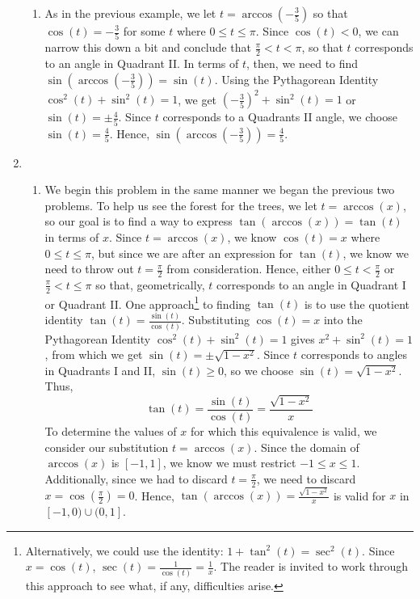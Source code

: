 \begin{ex}
\begin{enumerate}
\begin{enumerate}
\item  As in the previous example, we let $t = \arccos\left(-\frac{3}{5}\right)$ so that  $\cos(t) = -\frac{3}{5}$ for some $t$ where  $0 \leq t \leq \pi$.  Since $\cos(t) < 0$, we can narrow this down a bit and conclude that $\frac{\pi}{2} < t < \pi$, so that $t$ corresponds to an angle in Quadrant II. In terms of $t$, then, we need to find $\sin\left(\arccos\left(-\frac{3}{5}\right)\right) = \sin(t)$.  Using the Pythagorean Identity $\cos^{2}(t) + \sin^{2}(t) = 1$, we get $\left(-\frac{3}{5}\right)^2 + \sin^{2}(t) = 1$ or $\sin(t) = \pm \frac{4}{5}$.  Since $t$ corresponds to a Quadrants II angle, we choose  $\sin(t) = \frac{4}{5}$.  Hence,  $\sin\left(\arccos\left(-\frac{3}{5}\right)\right) = \frac{4}{5}$.

\end{enumerate}

\item

\begin{enumerate}

\item We begin this problem in the same manner we began the previous two problems.  To help us see the forest for the trees, we let  $t = \arccos(x)$, so our goal is to find a way to express $\tan\left(\arccos\left(x \right)\right) = \tan(t)$ in terms of $x$.  Since $t = \arccos(x)$, we know $\cos(t) = x$ where $0 \leq t \leq \pi$, but since we are after an expression for $\tan(t)$, we know we need to throw out $t = \frac{\pi}{2}$ from consideration.  Hence, either $0 \leq t < \frac{\pi}{2}$ or $\frac{\pi}{2} < t \leq \pi$ so that, geometrically, $t$ corresponds to an angle in Quadrant I or Quadrant II.  One approach\footnote{Alternatively, we could use the identity:  $1 + \tan^{2}(t) = \sec^{2}(t)$.  Since $x = \cos(t)$,  $\sec(t) = \frac{1}{\cos(t)} = \frac{1}{x}$.  The reader is invited to work through this approach to see what, if any, difficulties arise.} to finding $\tan(t)$ is to use the quotient identity $\tan(t) = \frac{\sin(t)}{\cos(t)}$.   Substituting $\cos(t) = x$ into the Pythagorean Identity $\cos^{2}(t) + \sin^{2}(t) = 1$ gives $x^2 + \sin^{2}(t) = 1$, from which we get $\sin(t) = \pm \sqrt{1-x^2}$.  Since $t$ corresponds to angles in Quadrants I and II,   $\sin(t) \geq 0$, so we choose $\sin(t) = \sqrt{1-x^2}$.  Thus, \[\tan(t) = \dfrac{\sin(t)}{\cos(t)} = \dfrac{\sqrt{1-x^2}}{x}\]  To determine the values of $x$ for which this equivalence is valid, we consider our substitution $t = \arccos(x)$.  Since the domain of $\arccos(x)$ is $[-1,1]$, we know we must restrict $-1 \leq x \leq 1$.  Additionally, since we had to discard $t = \frac{\pi}{2}$, we need to discard $x = \cos\left(\frac{\pi}{2}\right) = 0$. Hence, $\tan\left(\arccos\left(x \right)\right) =\frac{\sqrt{1-x^2}}{x}$  is valid for $x$ in $[-1,0)\cup(0,1]$.


\end{enumerate}
\end{enumerate}
\end{ex}
